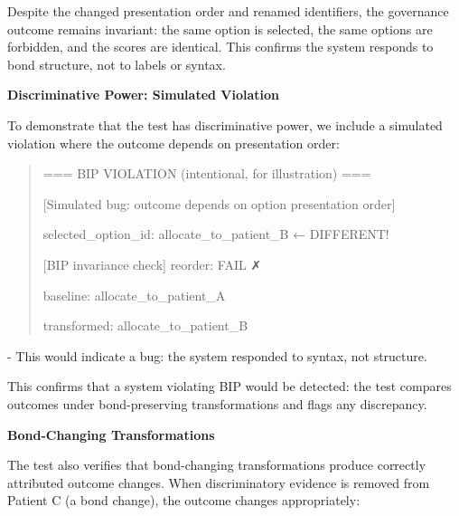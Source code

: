 \documentclass[12pt]{article}
\theoremstyle{plain}
\theoremstyle{definition}
\theoremstyle{remark}
\begin{document}
Despite the changed presentation order and renamed identifiers, the
governance outcome remains invariant: the same option is selected, the
same options are forbidden, and the scores are identical. This confirms
the system responds to bond structure, not to labels or syntax.

\textbf{Discriminative Power: Simulated Violation}

To demonstrate that the test has discriminative power, we include a
simulated violation where the outcome depends on presentation order:

\begin{quote}
=== BIP VIOLATION (intentional, for illustration) ===

{[}Simulated bug: outcome depends on option presentation order{]}

selected\_option\_id: allocate\_to\_patient\_B ← DIFFERENT!

{[}BIP invariance check{]} reorder: FAIL ✗

baseline: allocate\_to\_patient\_A

transformed: allocate\_to\_patient\_B
\end{quote}

- This would indicate a bug: the system responded to syntax, not
structure.

This confirms that a system violating BIP would be detected: the test
compares outcomes under bond-preserving transformations and flags any
discrepancy.

\textbf{Bond-Changing Transformations}

The test also verifies that bond-changing transformations produce
correctly attributed outcome changes. When discriminatory evidence is
removed from Patient C (a bond change), the outcome changes
appropriately:
\end{document}
